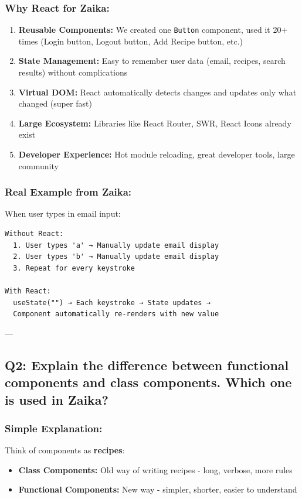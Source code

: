 \documentclass[12pt]{article}
\begin{document}
\subsubsection*{Why React for Zaika:}

\begin{enumerate}
    \item \textbf{Reusable Components:} We created one \texttt{Button} component, used it 20+ times (Login button, Logout button, Add Recipe button, etc.)
    \item \textbf{State Management:} Easy to remember user data (email, recipes, search results) without complications
    \item \textbf{Virtual DOM:} React automatically detects changes and updates only what changed (super fast)
    \item \textbf{Large Ecosystem:} Libraries like React Router, SWR, React Icons already exist
    \item \textbf{Developer Experience:} Hot module reloading, great developer tools, large community
\end{enumerate}

\subsubsection*{Real Example from Zaika:}

When user types in email input:
\begin{lstlisting}
Without React: 
  1. User types 'a' → Manually update email display
  2. User types 'b' → Manually update email display
  3. Repeat for every keystroke

With React:
  useState("") → Each keystroke → State updates → 
  Component automatically re-renders with new value
\end{lstlisting}

---

\subsection{Q2: Explain the difference between functional components and class components. Which one is used in Zaika?}

\subsubsection*{Simple Explanation:}

Think of components as \textbf{recipes}:
\begin{itemize}
    \item \textbf{Class Components:} Old way of writing recipes - long, verbose, more rules
    \item \textbf{Functional Components:} New way - simpler, shorter, easier to understand
\end{itemize}
\end{document}
